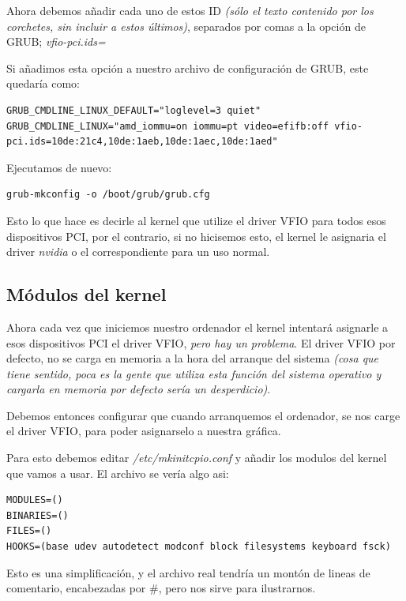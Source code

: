 \documentclass[12pt]{article}
\begin{document}
Ahora debemos añadir cada uno de estos ID \emph{(sólo el texto contenido por los corchetes, sin incluir a estos últimos)}, separados por comas a la opción de GRUB; \emph{vfio-pci.ids=}

Si añadimos esta opción a nuestro archivo de configuración de GRUB, este quedaría como:

\begin{lstlisting}[basicstyle=\scriptsize\ttfamily]
GRUB_CMDLINE_LINUX_DEFAULT="loglevel=3 quiet"
GRUB_CMDLINE_LINUX="amd_iommu=on iommu=pt video=efifb:off vfio-pci.ids=10de:21c4,10de:1aeb,10de:1aec,10de:1aed"
\end{lstlisting}

Ejecutamos de nuevo:

\begin{verbatim}
grub-mkconfig -o /boot/grub/grub.cfg
\end{verbatim}

Esto lo que hace es decirle al kernel que utilize el driver VFIO para todos esos dispositivos PCI, por el contrario, si no hicisemos esto, el kernel le asignaria el driver \emph{nvidia} o el correspondiente para un uso normal.

\subsection{Módulos del kernel}

Ahora cada vez que iniciemos nuestro ordenador el kernel intentará asignarle a esos dispositivos PCI el driver VFIO, \emph{pero hay un problema}. El driver VFIO por defecto, no se carga en memoria a la hora del arranque del sistema \emph{(cosa que tiene sentido, poca es la gente que utiliza esta función del sistema operativo y cargarla en memoria por defecto sería un desperdicio)}.

Debemos entonces configurar que cuando arranquemos el ordenador, se nos carge el driver VFIO, para poder asignarselo a nuestra gráfica.

Para esto debemos editar \emph{/etc/mkinitcpio.conf} y añadir los modulos del kernel que vamos a usar. El archivo se vería algo asi:

\begin{verbatim}
MODULES=()
BINARIES=()
FILES=()
HOOKS=(base udev autodetect modconf block filesystems keyboard fsck)
\end{verbatim}

Esto es una simplificación, y el archivo real tendría un montón de lineas de comentario, encabezadas por \#, pero nos sirve para ilustrarnos.
\end{document}
